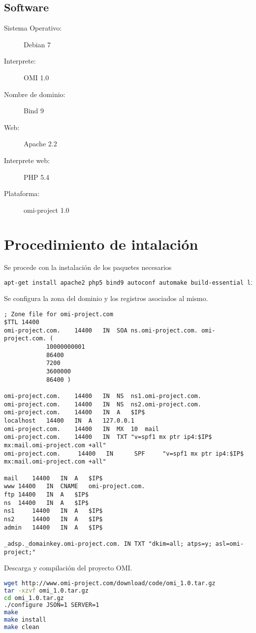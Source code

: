 \subsection{Software}
\begin{description}
\item[Sistema Operativo:] Debian 7
\item[Interprete:] OMI 1.0
\item[Nombre de dominio:] Bind 9
\item[Web:] Apache 2.2
\item[Interprete web:] PHP 5.4
\item[Plataforma:] omi-project 1.0
\end{description}

\section{Procedimiento de intalación}

Se procede con la instalación de los paquetes necesarios
\begin{lstlisting}[language=bash]
apt-get install apache2 php5 bind9 autoconf automake build-essential libreadline-dev libboost-regex-dev
\end{lstlisting}

Se configura la zona del dominio y los registros asociados al mismo.
\begin{lstlisting}
; Zone file for omi-project.com
$TTL 14400
omi-project.com.	14400	IN	SOA	ns.omi-project.com. omi-project.com. (
			10000000001
			86400
			7200
			3600000
			86400 )

omi-project.com.	14400	IN	NS	ns1.omi-project.com.
omi-project.com.	14400 	IN	NS	ns2.omi-project.com.
omi-project.com.	14400	IN	A	$IP$
localhost	14400	IN	A	127.0.0.1
omi-project.com.	14400	IN	MX	10	mail
omi-project.com. 	14400	IN	TXT	"v=spf1 mx ptr ip4:$IP$ mx:mail.omi-project.com +all"
omi-project.com.     14400   IN      SPF     "v=spf1 mx ptr ip4:$IP$ mx:mail.omi-project.com +all"

mail	14400	IN	A	$IP$
www	14400	IN	CNAME	omi-project.com.
ftp	14400	IN	A	$IP$
ns	14400	IN	A	$IP$
ns1 	14400  	IN	A	$IP$
ns2 	14400	IN	A	$IP$
admin 	14400	IN	A	$IP$

_adsp._domainkey.omi-project.com. IN TXT "dkim=all; atps=y; asl=omi-project;"
\end{lstlisting}

Descarga y compilación del proyecto OMI.

\begin{lstlisting}[language=bash]
wget http://www.omi-project.com/download/code/omi_1.0.tar.gz
tar -xzvf omi_1.0.tar.gz
cd omi_1.0.tar.gz
./configure JSON=1 SERVER=1
make
make install
make clean
\end{lstlisting}

